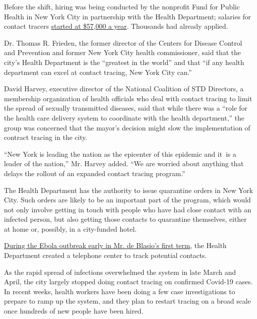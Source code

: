 Before the shift, hiring was being conducted by the nonprofit Fund for
Public Health in New York City in partnership with the Health
Department; salaries for contact tracers
\href{https://web.archive.org/web/20200428080921/https://1w20ju1nsz1k2xqrjx3ccsd1-wpengine.netdna-ssl.com/wp-content/uploads/sites/76/2020/04/CT-I.pdf}{started
at \$57,000 a year}. Thousands had already applied.

Dr. Thomas R. Frieden, the former director of the Centers for Disease
Control and Prevention and former New York City health commissioner,
said that the city's Health Department is the ``greatest in the world''
and that ``if any health department can excel at contact tracing, New
York City can.''

David Harvey, executive director of the National Coalition of STD
Directors, a membership organization of health officials who deal with
contact tracing to limit the spread of sexually transmitted diseases,
said that while there was a ``role for the health care delivery system
to coordinate with the health department,'' the group was concerned that
the mayor's decision might slow the implementation of contract tracing
in the city.

``New York is leading the nation as the epicenter of this epidemic and
it~is a leader of the nation,'' Mr. Harvey added. ``We are worried about
anything that delays the rollout of an expanded contact tracing
program.''

The Health Department has the authority to issue quarantine orders in
New York City. Such orders are likely to be an important part of the
program, which would not only involve getting in touch with people who
have had close contact with an infected person, but also getting those
contacts to quarantine themselves, either at home or, possibly, in a
city-funded hotel.

\href{https://www.nytimes3xbfgragh.onion/2014/10/24/nyregion/tracing-patients-possible-contacts-creates-host-of-challenges-for-the-city.html}{During
the Ebola outbreak early in Mr. de Blasio's first term}, the Health
Department created a telephone center to track potential contacts.

As the rapid spread of infections overwhelmed the system in late March
and April, the city largely stopped doing contact tracing on confirmed
Covid-19 cases. In recent weeks, health workers have been doing a few
case investigations to prepare to ramp up the system, and they plan to
restart tracing on a broad scale once hundreds of new people have been
hired.

